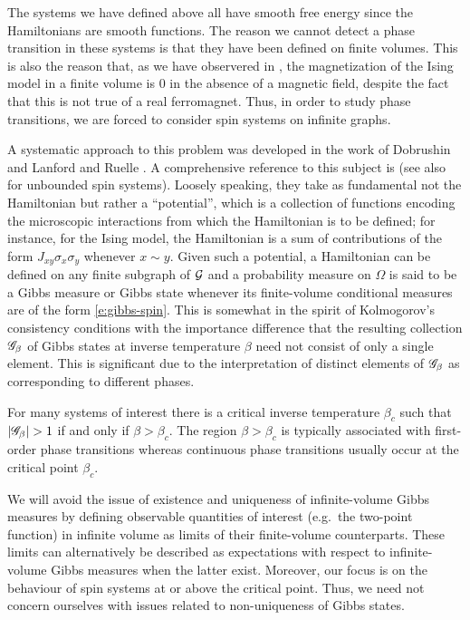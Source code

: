 The systems we have defined above all
have smooth free energy since the Hamiltonians are smooth functions. The reason we cannot
detect a phase transition in these systems is that they have been defined on finite volumes.
This is also the reason that, as we have observered in \REF, the magnetization of the Ising
model in a finite volume is $0$ in the absence of a magnetic field, despite the fact that
this is not true of a real ferromagnet. Thus, in order to study phase transitions, we are
forced to consider spin systems on infinite graphs.

A systematic approach to this problem was developed in the work of Dobrushin \cite{Dobrushin68}
and Lanford and Ruelle \cite{LR69}. A comprehensive reference to this subject is \cite{Georgii11}
(see also \cite{LP76} for unbounded spin systems).
Loosely speaking, they take as fundamental not the Hamiltonian
but rather a ``potential'', which is a collection of functions encoding the microscopic interactions
from which the Hamiltonian is to be defined; for instance, for the Ising model,
the Hamiltonian is a sum of contributions of the form $J_{xy} \sigma_x \sigma_y$ whenever
$x \sim y$. Given such a potential, a Hamiltonian can be defined on any
finite subgraph of $\mathcal{G}$ and a probability measure on $\Omega$ is said to be a Gibbs
measure or Gibbs state whenever its finite-volume conditional measures are of the form \eqref{e:gibbs-spin}.
This is somewhat in the spirit of Kolmogorov's consistency conditions with the importance
difference that the resulting collection $\mathscr{G}_\beta$ of Gibbs states at inverse temperature
$\beta$ need not consist of only a single element. This is significant due to the interpretation
of distinct elements of $\mathscr{G}_\beta$ as corresponding to different phases.

For many systems of interest there is a critical inverse temperature $\beta_c$ such that
$|\mathscr{G}_\beta| > 1$ if and only if $\beta > \beta_c$. The region $\beta > \beta_c$ is typically
associated with first-order phase transitions whereas continuous phase transitions usually occur
at the critical point $\beta_c$.

We will avoid the issue of existence and uniqueness of infinite-volume Gibbs
measures
by defining observable quantities of interest (e.g.\ the two-point function) in infinite
volume as limits of their finite-volume counterparts. These limits can alternatively be
described as expectations with respect to infinite-volume Gibbs measures when the latter
exist. Moreover, our focus is on the behaviour of spin systems at or above the critical
point. Thus, we need not concern ourselves with issues related to non-uniqueness of Gibbs
states.

